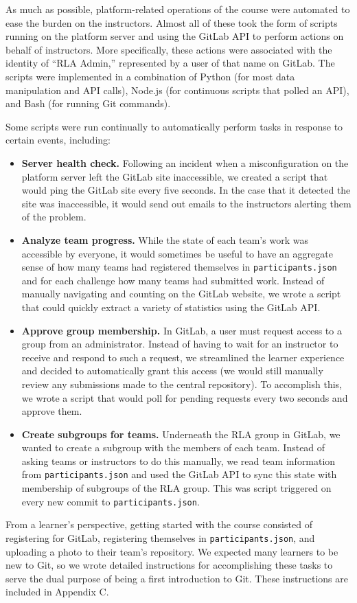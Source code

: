 \documentclass[12pt,twoside]{mitthesis}
\newcommand{\review}[1]{{#1}}
\begin{document}
\review{As much as possible, platform-related operations of the course were automated to ease the burden on the instructors. Almost all of these took the form of scripts running on the platform server and using the GitLab API to perform actions on behalf of instructors. More specifically, these actions were associated with the identity of ``RLA Admin,'' represented by a user of that name on GitLab. The scripts were implemented in a combination of Python (for most data manipulation and API calls), Node.js (for continuous scripts that polled an API), and Bash (for running Git commands).

Some scripts were run continually to automatically perform tasks in response to certain events, including:
\begin{itemize}
\item \textbf{Server health check.} Following an incident when a misconfiguration on the platform server left the GitLab site inaccessible, we created a script that would ping the GitLab site every five seconds. In the case that it detected the site was inaccessible, it would send out emails to the instructors alerting them of the problem.
\item \textbf{Analyze team progress.} While the state of each team's work was accessible by everyone, it would sometimes be useful to have an aggregate sense of how many teams had registered themselves in \texttt{participants.json} and for each challenge how many teams had submitted work. Instead of manually navigating and counting on the GitLab website, we wrote a script that could quickly extract a variety of statistics using the GitLab API.
\item \textbf{Approve group membership.} In GitLab, a user must request access to a group from an administrator. Instead of having to wait for an instructor to receive and respond to such a request, we streamlined the learner experience and decided to automatically grant this access (we would still manually review any submissions made to the central repository). To accomplish this, we wrote a script that would poll for pending requests every two seconds and approve them. 
\item \textbf{Create subgroups for teams.} Underneath the RLA group in GitLab, we wanted to create a subgroup with the members of each team. Instead of asking teams or instructors to do this manually, we read team information from \texttt{participants.json} and used the GitLab API to sync this state with membership of subgroups of the RLA group. This was script triggered on every new commit to \texttt{participants.json}.
\end{itemize}
From a learner's perspective, getting started with the course consisted of registering for GitLab, registering themselves in \texttt{participants.json}, and uploading a photo to their team's repository. We expected many learners to be new to Git, so we wrote detailed instructions for accomplishing these tasks to serve the dual purpose of being a first introduction to Git. These instructions are included in Appendix C.

}
\end{document}
